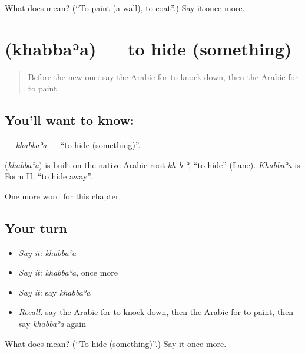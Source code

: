 \begin{tcolorbox}[breakable,colback=teal!4,colframe=teal!35!black,title={Before you move on}]
What does  mean? (\textquotedblleft{}To paint (a wall), to coat\textquotedblright{}.) Say it once more.
\end{tcolorbox}
\section[\texorpdfstring{\ar{خبأ} (khabbaʾa)}{خبأ (khabbaʾa)}]{ (khabbaʾa) — to hide (something)}

\label{lesson:AR-C166-khabbaa}



\begin{quote}
Before the new one: say the Arabic for to knock down, then the Arabic for to paint.
\end{quote}

\subsection*{You'll want to know: }
\textbf{} — \emph{khabbaʾa} — \textquotedblleft{}to hide (something)\textquotedblright{}.

\begin{cousinweb}
\textbf{} (\emph{khabbaʾa}) is built on the native Arabic root \emph{kh-b-ʾ}, \textquotedblleft{}to hide\textquotedblright{} (Lane). \emph{Khabbaʾa} is Form II, \textquotedblleft{}to hide away\textquotedblright{}.
\end{cousinweb}

\begin{grammarlens}[title={What you've built}]
One more word for this chapter.
\end{grammarlens}

\subsection*{Your turn}
\begin{itemize}
\raggedright
  \item \emph{Say it:} \emph{khabbaʾa}
  \item \emph{Say it:} \emph{khabbaʾa}, once more
  \item \emph{Say it:} say \emph{khabbaʾa}
  \item \emph{Recall:} say the Arabic for to knock down, then the Arabic for to paint, then say \emph{khabbaʾa} again
\end{itemize}

\begin{tcolorbox}[breakable,colback=teal!4,colframe=teal!35!black,title={Before you move on}]
What does  mean? (\textquotedblleft{}To hide (something)\textquotedblright{}.) Say it once more.
\end{tcolorbox}
